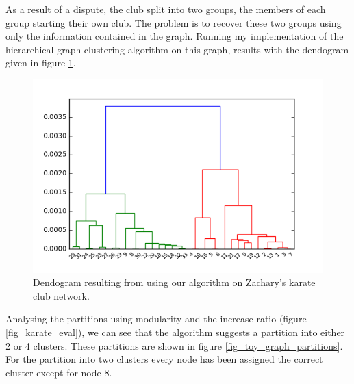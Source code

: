 \documentclass[12pt]{article}
\theoremstyle{definition}
\begin{document}
As a result of a dispute, the club split into two groups, the members of each group starting their own club. The problem is to recover these two groups using only the information contained in the graph. Running my implementation of the hierarchical graph clustering algorithm on this graph, results with the dendogram given in figure \ref{fig_karate_graph_dendogram}.
\begin{figure}
	\includegraphics[scale=0.5]{karate_dendogram}
	\centering
	\caption{Dendogram resulting from using our algorithm on Zachary's karate club network.}
	\label{fig_karate_graph_dendogram}
\end{figure}

Analysing the partitions using modularity and the increase ratio (figure \ref{fig_karate_eval}), we can see that the algorithm suggests a partition into either 2 or 4 clusters. These partitions are shown in figure \ref{fig_toy_graph_partitions}. For the partition into two clusters every node has been assigned the correct cluster except for node 8.
\end{document}
